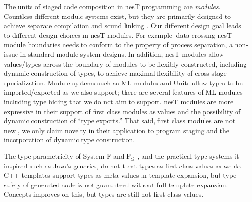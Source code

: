 
The units of staged code composition in nesT programming are \emph{modules}. Countless different
module systems exist, but they are primarily designed to achieve separate compilation and sound
linking
\cite{Cardelli-1997}. %
Our different design goal leads to different design choices in nesT modules. For example, data
crossing nesT module boundaries needs to conform to the property of process separation, a
non-issue in standard module system designs. In addition, nesT modules allow values/types across
the boundary of modules to be flexibly constructed, including dynamic construction of types, to
achieve maximal flexibility of cross-stage specialization. Module systems such as ML modules
\cite{macqueen84} %
and Units \cite{flatt98units} allow types to be imported/exported as we also support; there are
several features of ML modules including type hiding that we do not aim to
support. %
nesT modules are more expressive in their support of first class modules as values and the
possibility of dynamic construction of ``type exports.'' That said, first class modules are not
new \cite{99620,ancona01calculus}, %
we only claim novelty in their application to program staging and the incorporation of dynamic
type construction.

The type parametricity of System F and F$_\le$ \cite{Cardelli-1985}, and the practical type
systems it inspired such as Java's generics, do not treat types as first class values as we do.
C++ templates support types as meta values in template expansion, but type safety of generated
code is not guaranteed without full template expansion. Concepts \cite{gregor06:_concepts}
improves on this, but types are still not first class values.



